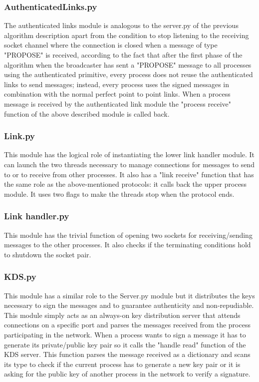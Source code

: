 \documentclass[12pt]{article}
\begin{document}
\subsubsection{AuthenticatedLinks.py}
The authenticated links module is analogous to the server.py of the previous algorithm     description apart from the condition to stop listening to the receiving socket channel where the connection is closed when a message of type "PROPOSE" is received, according to the fact that after the first phase of the algorithm when the broadcaster has sent a "PROPOSE" message to all processes using the authenticated primitive, every process does not reuse the authenticated links to send messages; instead, every process uses the signed messages in combination with the normal perfect point to point links. When a process message is received by the authenticated link module the "process receive" function of the above described module is called back. \\
\subsubsection{Link.py}
This module has the logical role of instantiating the lower link handler module. It can launch the two threads necessary to manage connections for messages to send to or to receive from other processes. It also has a "link receive" function that has the same role as the above-mentioned protocols: it calls back the upper process module. It uses two flags to make the threads stop when the protocol ends. \\
\subsubsection{Link handler.py}
This module has the trivial function of opening two sockets for receiving/sending messages to the other processes. It also checks if the terminating conditions hold to shutdown the socket pair. \\
\subsubsection{KDS.py}
This module has a similar role to the Server.py module but it distributes the keys necessary to sign the messages and to guarantee authenticity and non-repudiable.
This module simply acts as an always-on key distribution server that attends connections on  a specific port and parses the messages received from the process participating in the network. When a process wants to sign a message it has to generate its private/public key pair so it calls the "handle read" function of the KDS server. This function parses the message received as a dictionary and scans its type to check if the current process has to generate a new key pair or it is asking for the public key of another process in the network to verify a signature. \\
\\
\end{document}

